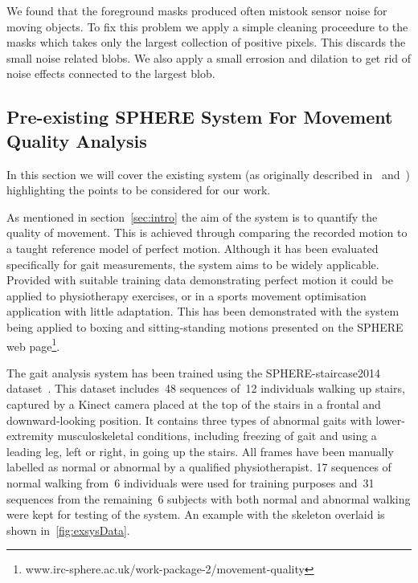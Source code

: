 \documentclass[11pt]{article} %
\begin{document}
We found that the foreground masks produced often mistook sensor noise for moving objects. To fix this problem we apply a simple cleaning proceedure to the masks which takes only the largest collection of positive pixels. This discards the small noise related blobs. We also apply a small errosion and dilation to get rid of noise effects connected to the largest blob.









\begin{appendices}

\section{Pre-existing SPHERE System For Movement Quality Analysis}

\label{sec:exSys}

In this section we will cover the existing system (as originally described in~\cite{Paiement} and~\cite{Tao}) highlighting the points to be considered for our work.

As mentioned in section~\ref{sec:intro} the aim of the system is to quantify the quality of movement. This is achieved through comparing the recorded motion to a taught reference model of perfect motion. Although it has been evaluated specifically for gait measurements, the system aims to be widely applicable. Provided with suitable training data demonstrating perfect motion it could be applied to physiotherapy exercises, or in a sports movement optimisation application with little adaptation. This has been demonstrated with the system being applied to boxing and sitting-standing motions presented on the SPHERE web page\footnote{www.irc-sphere.ac.uk/work-package-2/movement-quality}.


The gait analysis system has been trained using the SPHERE-staircase2014 dataset~\cite{Paiement}. This dataset includes~48 sequences of~12 individuals walking up stairs, captured by a Kinect camera placed at the top of the stairs in a frontal and downward-looking position. It contains three types of abnormal gaits with lower-extremity musculoskeletal conditions, including freezing of gait and using a leading leg, left or right, in going up the stairs. All frames have been manually labelled as normal or abnormal by a qualified physiotherapist. 17 sequences of normal walking from~6 individuals were used for training purposes and~31 sequences from the remaining~6 subjects with both normal and abnormal walking were kept for testing of the system. An example with the skeleton overlaid is shown in~\ref{fig:exsysData}.



\end{appendices}
\end{document}

